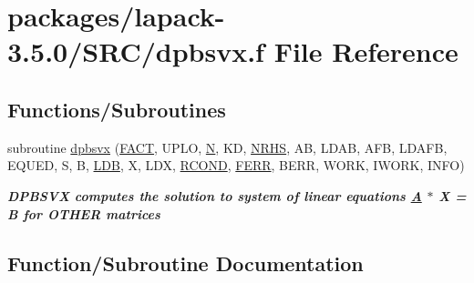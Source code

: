 \hypertarget{dpbsvx_8f}{}\section{packages/lapack-\/3.5.0/\+S\+R\+C/dpbsvx.f File Reference}
\label{dpbsvx_8f}
\subsection*{Functions/\+Subroutines}
\begin{DoxyCompactItemize}
\item 
subroutine \hyperlink{dpbsvx_8f_af0406a1d8cc6fce00fd4b23e5edde101}{dpbsvx} (\hyperlink{superlu__enum__consts_8h_af00a42ecad444bbda75cde1b64bd7e72a1b6692b56d378abb85bd49063721d034}{F\+A\+C\+T}, U\+P\+L\+O, \hyperlink{polmisc_8c_a0240ac851181b84ac374872dc5434ee4}{N}, K\+D, \hyperlink{example__user_8c_aa0138da002ce2a90360df2f521eb3198}{N\+R\+H\+S}, A\+B, L\+D\+A\+B, A\+F\+B, L\+D\+A\+F\+B, E\+Q\+U\+E\+D, S, B, \hyperlink{example__user_8c_a50e90a7104df172b5a89a06c47fcca04}{L\+D\+B}, X, L\+D\+X, \hyperlink{superlu__enum__consts_8h_af00a42ecad444bbda75cde1b64bd7e72a9b5c151728d8512307565994c89919d5}{R\+C\+O\+N\+D}, \hyperlink{superlu__enum__consts_8h_af00a42ecad444bbda75cde1b64bd7e72a78fd14d7abebae04095cfbe02928f153}{F\+E\+R\+R}, B\+E\+R\+R, W\+O\+R\+K, I\+W\+O\+R\+K, I\+N\+F\+O)
\begin{DoxyCompactList}\small\item\em {\bfseries  D\+P\+B\+S\+V\+X computes the solution to system of linear equations \hyperlink{classA}{A} $\ast$ X = B for O\+T\+H\+E\+R matrices} \end{DoxyCompactList}\end{DoxyCompactItemize}


\subsection{Function/\+Subroutine Documentation}
\hypertarget{dpbsvx_8f_af0406a1d8cc6fce00fd4b23e5edde101}{}
